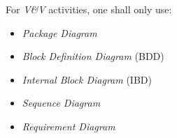 For \emph{V\&V} activities, one shall only use:
\begin{itemize}
\item \emph{Package Diagram}
\item \emph{Block Definition Diagram} (BDD)
\item \emph{Internal Block Diagram} (IBD)
\item \emph{Sequence Diagram}
\item \emph{Requirement Diagram}
\end{itemize}

